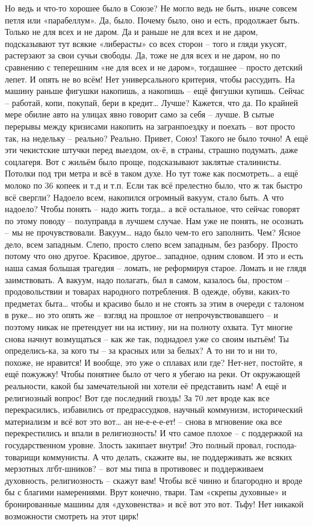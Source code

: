 Но ведь и что-то хорошее было в Союзе? Не могло ведь не быть, иначе совсем петля или «парабеллум». Да, было. Почему было, оно и есть, продолжает быть. Только не для всех и не даром. Да и раньше не для всех и не даром, подсказывают тут всякие «либерасты» со всех сторон – того и гляди укусят, растерзают за свои сучьи свободы. Да, тоже не для всех и не даром, но по сравнению с теперешним «не для всех и не даром», тогдашнее – просто детский лепет. И опять не во всём! Нет универсального критерия, чтобы рассудить. На машину раньше фигушки накопишь, а накопишь – ещё фигушки купишь. Сейчас – работай, копи, покупай, бери в кредит… Лучше? Кажется, что да. По крайней мере обилие авто на улицах явно говорит само за себя – лучше. В сытые перерывы между кризисами накопить на загранпоездку и поехать – вот просто так, на недельку – реально? Реально. Привет, Союз! Такого не было точно! А ещё эти чекистские штучки перед выездом, ох-ё, в страны, страшно подумать, даже соцлагеря. Вот с жильём было проще, подсказывают заклятые сталинисты. Потолки под три метра и всё в таком духе. Но тут тоже как посмотреть… а ещё молоко по 36 копеек и т.д и т.п. 
Если так всё прелестно было, что ж так быстро всё свергли? Надоело всем, накопился огромный вакуум, стало быть. А что надоело? Чтобы понять – надо жить тогда… а всё остальное, что сейчас говорят по этому поводу – полуправда в лучшем случае. Нам уже не понять, не осознать – мы не прочувствовали. Вакуум… надо было чем-то его заполнить. Чем? Ясное дело, всем западным. Слепо, просто слепо всем западным, без разбору. Просто потому что оно другое. Красивое, другое… западное, одним словом. И это и есть наша самая большая трагедия – ломать, не реформируя старое. Ломать и не глядя заимствовать. А вакуум, надо полагать, был в самом, казалось бы, простом – продовольствии и товарах народного потребления. В одежде, обуви, каких-то предметах быта… чтобы и красиво было и не стоять за этим в очереди с талоном в руке… но это опять же – взгляд на прошлое от непрочувствовавшего – и поэтому никак не претендует ни на истину, ни на полноту охвата.
Тут многие снова начнут возмущаться – как же так, поднадоел уже со своим нытьём! Ты определись-ка, за кого ты – за красных или за белых? А то ни то и ни то, похоже, не нравится! И вообще, это уже о сплавах или где? Нет-нет, постойте, я ещё пожужжу! Чтобы понятнее было от чего я убегаю на реки. От окружающей реальности, какой бы замечательной ни хотели её представить нам!
А ещё и религиозный вопрос! Вот где последний гвоздь! За 70 лет вроде как все перекрасились, избавились от предрассудков, научный коммунизм, исторический материализм и всё вот это вот… ан не-е-е-е-ет! – снова в мгновение ока все перекрестились и впали в религиозность! И что самое плохое – с поддержкой на государственном уровне. Злость закипает внутри! Это полный провал, господа-товарищи коммунисты. А что делать, скажите вы, не поддерживать же всяких мерзотных лгбт-шников? – вот мы типа в противовес и поддерживаем духовность, религиозность – скажут вам! Чтобы всё чинно и благородно и вроде бы с благими намерениями. Врут конечно, твари. Там «скрепы духовные» и бронированные машины для «духовенства» и всё вот это вот. Тьфу! Нет никакой возможности смотреть на этот цирк!

